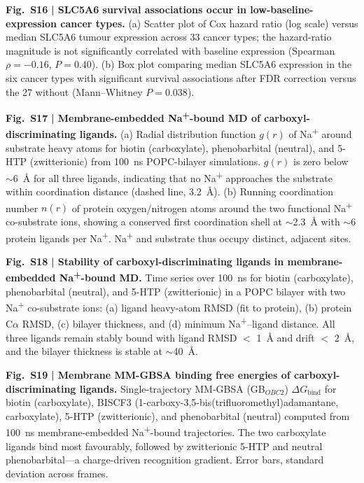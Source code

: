 \documentclass[pdflatex,sn-nature]{sn-jnl}
\begin{document}
\noindent\textbf{Fig.~S16} \textbf{| SLC5A6 survival associations occur in low-baseline-expression cancer types.} (a) Scatter plot of Cox hazard ratio (log scale) versus median SLC5A6 tumour expression across 33 cancer types; the hazard-ratio magnitude is not significantly correlated with baseline expression (Spearman $\rho=-0.16$, $P=0.40$). (b) Box plot comparing median SLC5A6 expression in the six cancer types with significant survival associations after FDR correction versus the 27 without (Mann--Whitney $P=0.038$).

\noindent\textbf{Fig.~S17} \textbf{| Membrane-embedded Na\textsuperscript{+}-bound MD of carboxyl-discriminating ligands.} (a) Radial distribution function $g(r)$ of Na\textsuperscript{+} around substrate heavy atoms for biotin (carboxylate), phenobarbital (neutral), and 5-HTP (zwitterionic) from 100~ns POPC-bilayer simulations. $g(r)$ is zero below $\sim$6~\AA{} for all three ligands, indicating that no Na\textsuperscript{+} approaches the substrate within coordination distance (dashed line, 3.2~\AA{}). (b) Running coordination number $n(r)$ of protein oxygen/nitrogen atoms around the two functional Na\textsuperscript{+} co-substrate ions, showing a conserved first coordination shell at $\sim$2.3~\AA{} with $\sim$6 protein ligands per Na\textsuperscript{+}. Na\textsuperscript{+} and substrate thus occupy distinct, adjacent sites.

\noindent\textbf{Fig.~S18} \textbf{| Stability of carboxyl-discriminating ligands in membrane-embedded Na\textsuperscript{+}-bound MD.} Time series over 100~ns for biotin (carboxylate), phenobarbital (neutral), and 5-HTP (zwitterionic) in a POPC bilayer with two Na\textsuperscript{+} co-substrate ions: (a) ligand heavy-atom RMSD (fit to protein), (b) protein C$\alpha$ RMSD, (c) bilayer thickness, and (d) minimum Na\textsuperscript{+}--ligand distance. All three ligands remain stably bound with ligand RMSD $<$ 1~\AA{} and drift $<$ 2~\AA{}, and the bilayer thickness is stable at $\sim$40~\AA{}.

\noindent\textbf{Fig.~S19} \textbf{| Membrane MM-GBSA binding free energies of carboxyl-discriminating ligands.} Single-trajectory MM-GBSA (GB$_{OBC2}$) $\Delta G_{\mathrm{bind}}$ for biotin (carboxylate), BISCF3 (1-carboxy-3,5-bis(trifluoromethyl)adamantane, carboxylate), 5-HTP (zwitterionic), and phenobarbital (neutral) computed from 100~ns membrane-embedded Na\textsuperscript{+}-bound trajectories. The two carboxylate ligands bind most favourably, followed by zwitterionic 5-HTP and neutral phenobarbital---a charge-driven recognition gradient. Error bars, standard deviation across frames.
\end{document}
